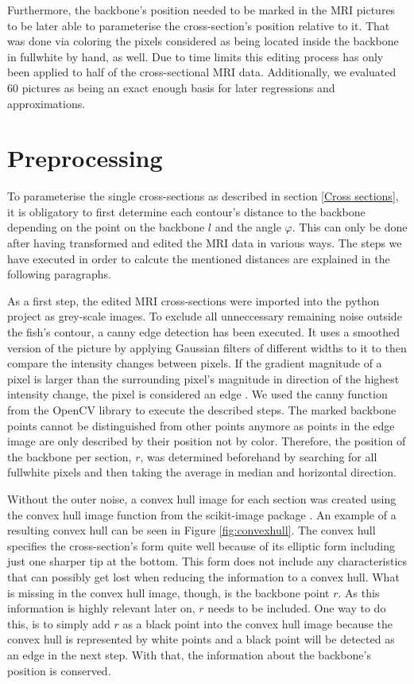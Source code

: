 Furthermore, the backbone's position needed to be marked in the MRI pictures to be later able to parameterise the cross-section's position relative to it. That was done via coloring the pixels considered as being located inside the backbone in fullwhite by hand, as well. Due to time limits this editing process has only been applied to half of the cross-sectional MRI data. Additionally, we evaluated 60 pictures as being an exact enough basis for later regressions and approximations.

\section{Preprocessing}
    \label{preprocessing}
    
To parameterise the single cross-sections as described in section \ref{Cross sections}, it is obligatory to first determine each contour's distance to the backbone depending on the point on the backbone $l$ and the angle $\varphi$. This can only be done after having transformed and edited the MRI data in various ways. The steps we have executed in order to calcute the mentioned distances are explained in the following paragraphs. 

As a first step, the edited MRI cross-sections were imported into the python project as grey-scale images. To exclude all unneccessary remaining noise outside the fish's contour, a canny edge detection \cite{canny1986computational} has been executed. It uses a smoothed version of the picture by applying Gaussian filters of different widths to it to then compare the intensity changes between pixels. If the gradient magnitude of a pixel is larger than the surrounding pixel's magnitude in direction of the highest intensity change, the pixel is considered an edge \cite{ding2001canny}. We used the canny function from the OpenCV library \cite{opencv_library} to execute the described steps. The marked backbone points cannot be distinguished from other points anymore as points in the edge image are only described by their position not by color. Therefore, the position of the backbone per section, $r$, was determined beforehand by searching for all fullwhite pixels and then taking the average in median and horizontal direction.

Without the outer noise, a convex hull image for each section was created using the convex hull image function from the scikit-image package \cite{scikit-image}. An example of a resulting convex hull can be seen in Figure \ref{fig:convexhull}. The convex hull specifies the cross-section's form quite well because of its elliptic form including just one sharper tip at the bottom. This form does not include any characteristics that can possibly get lost when reducing the information to a convex hull. What is missing in the convex hull image, though, is the backbone point $r$. As this information is highly relevant later on, $r$ needs to be included. One way to do this, is to simply add $r$ as a black point into the convex hull image because the convex hull is represented by white points and a black point will be detected as an edge in the next step. With that, the information about the backbone's position is conserved.

